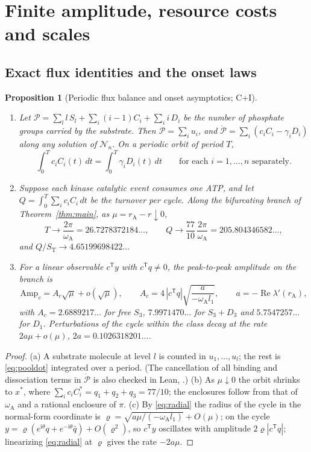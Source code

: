 \documentclass[11pt,a4paper]{article}
\theoremstyle{plain}
\newtheorem{proposition}[theorem]{Proposition}
\theoremstyle{definition}
\theoremstyle{remark}
\newcommand{\ii}{\mathrm i}
\newcommand{\T}{\mathsf T}
\newcommand{\cN}{\mathcal N}
\newcommand{\ST}{S_{\mathrm T}}
\newcommand{\rA}{r_{\mathrm A}}
\newcommand{\omA}{\omega_{\mathrm A}}
\DeclareMathOperator{\Ree}{Re}
\newcommand{\evC}{\textsf{C}}
\newcommand{\evI}{\textsf{I}}
\begin{document}
\section{Finite amplitude, resource costs and scales}\label{sec:resources}

\subsection{Exact flux identities and the onset laws}
\begin{proposition}[Periodic flux balance and onset asymptotics; \evC+\evI]\label{prop:flux}
\begin{enumerate}[label=\textup{(\alph*)}]
\item Let
$\mathcal P=\sum_{l}l\,S_l+\sum_{i}(i-1)C_i+\sum_{i}i\,D_i$
be the number of phosphate groups carried by the substrate. Then $\mathcal P=\sum_iu_i$, and $\dot{\mathcal P}=\sum_i(c_iC_i-\gamma_iD_i)$ along any solution of $\cN_n$. On a periodic orbit of period $T$,
\begin{equation}\label{eq:edge}
 \int_0^Tc_iC_i(t)\,dt=\int_0^T\gamma_iD_i(t)\,dt\qquad\text{for each }i=1,\dots,n\text{ separately.}
\end{equation}
\item Suppose each kinase catalytic event consumes one ATP, and let $Q=\int_0^T\sum_ic_iC_i\,dt$ be the turnover per cycle. Along the bifurcating branch of Theorem~\ref{thm:main}, as $\mu=\rA-r\downarrow0$,
\[
 T\to\frac{2\pi}{\omA}=26.7278372184\ldots,\qquad Q\to\frac{77}{10}\,\frac{2\pi}{\omA}=205.804346582\ldots,
\]
and $Q/\ST\to4.65199698422\ldots$
\item For a linear observable $c^{\T}y$ with $c^{\T}q\ne0$, the peak-to-peak amplitude on the branch is
\begin{equation}\label{eq:amplitude}
 \mathrm{Amp}_c=A_c\sqrt\mu+o(\sqrt\mu),\qquad A_c=4\,|c^{\T}q|\sqrt{\frac{a}{-\omA l_1}},\qquad a=-\Ree\lambda'(\rA),
\end{equation}
with $A_c=2.6889217\ldots$ for free $S_3$, $7.9971470\ldots$ for $S_3+D_3$ and $5.7547257\ldots$ for $D_1$. Perturbations of the cycle within the class decay at the rate $2a\mu+o(\mu)$, $2a=0.1026318201\ldots$.
\end{enumerate}
\end{proposition}
\begin{proof}
(a) A substrate molecule at level $l$ is counted in $u_1,\dots,u_l$; the rest is \eqref{eq:pooldot} integrated over a period. (The cancellation of all binding and dissociation terms in $\dot{\mathcal P}$ is also checked in Lean, .) (b) As $\mu\downarrow0$ the orbit shrinks to $x^*$, where $\sum_ic_iC_i^*=q_1+q_2+q_3=77/10$; the enclosures follow from that of $\omA$ and a rational enclosure of $\pi$. (c) By \eqref{eq:radial} the radius of the cycle in the normal-form coordinate is $\varrho=\sqrt{a\mu/(-\omA l_1)}+O(\mu)$; on the cycle $y=\varrho(e^{\ii\theta}q+e^{-\ii\theta}\bar q)+O(\varrho^2)$, so $c^{\T}y$ oscillates with amplitude $2\varrho|c^{\T}q|$; linearizing \eqref{eq:radial} at $\varrho$ gives the rate $-2a\mu$.
\end{proof}
\end{document}

